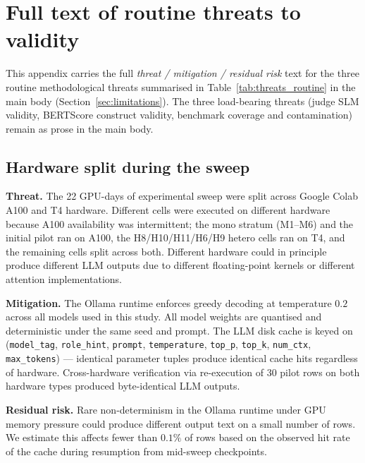 \section{Full text of routine threats to validity}
\label{sec:appendix_threats}

This appendix carries the full \emph{threat / mitigation / residual risk}
text for the three routine methodological threats summarised in
Table~\ref{tab:threats_routine} in the main body
(Section~\ref{sec:limitations}). The three load-bearing threats
(judge SLM validity, BERTScore construct validity, benchmark coverage
and contamination) remain as prose in the main body.

\subsection{Hardware split during the sweep}
\label{sec:appendix_hardware_split}

\textbf{Threat.} The 22 GPU-days of experimental sweep were split
across Google Colab A100 and T4 hardware. Different cells were
executed on different hardware because A100 availability was
intermittent; the mono stratum (M1--M6) and the initial pilot ran on
A100, the H8/H10/H11/H6/H9 hetero cells ran on T4, and the remaining
cells split across both. Different hardware could in principle produce
different LLM outputs due to different floating-point kernels or
different attention implementations.

\textbf{Mitigation.} The Ollama runtime enforces greedy decoding at
temperature $0.2$ across all models used in this study. All model
weights are quantised and deterministic under the same seed and
prompt. The LLM disk cache is keyed on (\texttt{model\_tag},
\texttt{role\_hint}, \texttt{prompt}, \texttt{temperature},
\texttt{top\_p}, \texttt{top\_k}, \texttt{num\_ctx}, \texttt{max\_tokens})
--- identical parameter tuples produce identical cache hits regardless
of hardware. Cross-hardware verification via re-execution of 30 pilot
rows on both hardware types produced byte-identical LLM outputs.

\textbf{Residual risk.} Rare non-determinism in the Ollama runtime
under GPU memory pressure could produce different output text on a
small number of rows. We estimate this affects fewer than $0.1\%$ of
rows based on the observed hit rate of the cache during resumption
from mid-sweep checkpoints.

